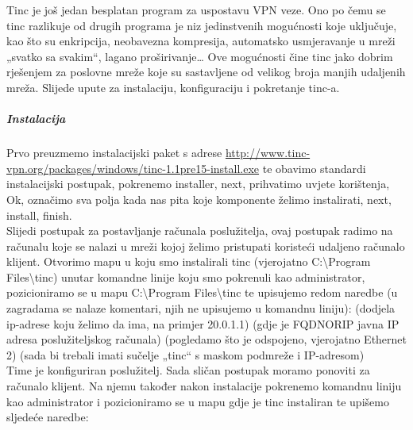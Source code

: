 \hfill \smallbreak
Tinc je još jedan besplatan program za uspostavu VPN veze. Ono po čemu se tinc razlikuje od drugih programa je niz jedinstvenih mogućnosti koje uključuje, kao što su enkripcija, neobavezna kompresija, automatsko usmjeravanje u mreži „svatko sa svakim“, lagano proširivanje… Ove mogućnosti čine tinc jako dobrim rješenjem za poslovne mreže koje su sastavljene od velikog broja manjih udaljenih mreža. Slijede upute za instalaciju, konfiguraciju i pokretanje tinc-a.

\subparagraph{Instalacija}
\hfill \smallbreak
Prvo preuzmemo instalacijski paket s adrese 
\url{http://www.tinc-vpn.org/packages/windows/tinc-1.1pre15-install.exe} te obavimo standardi instalacijski postupak, pokrenemo installer, next, prihvatimo uvjete korištenja, Ok, označimo sva polja kada nas pita koje komponente želimo instalirati, next, install, finish. \\Slijedi postupak za postavljanje računala poslužitelja, ovaj postupak radimo na računalu koje se nalazi u mreži kojoj želimo pristupati koristeći udaljeno računalo klijent. Otvorimo mapu u koju smo instalirali tinc (vjerojatno C:\textbackslash Program Files\textbackslash tinc) unutar komandne linije koju smo pokrenuli kao administrator, pozicioniramo se u mapu C:\textbackslash Program Files\textbackslash tinc te upisujemo redom naredbe (u zagradama se nalaze komentari, njih ne upisujemo u komandnu liniju):
\FloatBarrier
\smallbreak {}
\smallbreak {} (dodjela ip-adrese koju želimo da ima, na primjer 20.0.1.1)
\smallbreak {}  (gdje je FQDNORIP javna IP adresa poslužiteljskog računala)
\smallbreak {}
\smallbreak {}
\smallbreak {}
\smallbreak {}  (pogledamo što je odspojeno, vjerojatno Ethernet 2)
\smallbreak {}
\smallbreak {}
\smallbreak {}  (sada bi trebali imati sučelje „tinc“ s maskom podmreže i IP-adresom)\\
\FloatBarrier
Time je konfiguriran poslužitelj. Sada sličan postupak moramo ponoviti za računalo klijent. Na njemu također nakon instalacije pokrenemo komandnu liniju kao administrator i pozicioniramo se u mapu gdje je tinc instaliran te upišemo sljedeće naredbe:
\FloatBarrier
\smallbreak {}
\smallbreak {}
